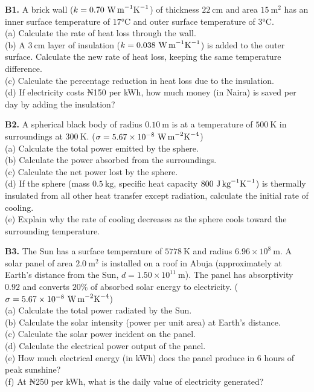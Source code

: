 \begin{exercisebox}[16]
\textbf{B1.} A brick wall ($k = 0.70\ \text{W\,m}^{-1}\text{K}^{-1}$)
of thickness $22\ \text{cm}$ and area $15\ \text{m}^2$
has an inner surface temperature of $17°\text{C}$
and outer surface temperature of $3°\text{C}$.\\[4pt]
(a) Calculate the rate of heat loss through the wall.\\
(b) A $3\ \text{cm}$ layer of insulation
($k = 0.038\ \text{W\,m}^{-1}\text{K}^{-1}$) is
added to the outer surface. Calculate the new rate
of heat loss, keeping the same temperature difference.\\
(c) Calculate the percentage reduction in heat loss
due to the insulation.\\
(d) If electricity costs ₦150 per kWh, how much
money (in Naira) is saved per day by adding the
insulation?
\hfill{}

\vspace{0.4cm}

\textbf{B2.} A spherical black body of radius
$0.10\ \text{m}$ is at a temperature of $500\ \text{K}$
in surroundings at $300\ \text{K}$.
($\sigma = 5.67\times10^{-8}\ \text{W\,m}^{-2}\text{K}^{-4}$)\\[4pt]
(a) Calculate the total power emitted by the sphere.\\
(b) Calculate the power absorbed from the surroundings.\\
(c) Calculate the net power lost by the sphere.\\
(d) If the sphere (mass $0.5\ \text{kg}$, specific
heat capacity $800\ \text{J\,kg}^{-1}\text{K}^{-1}$)
is thermally insulated from all other heat transfer
except radiation, calculate the initial rate of
cooling.\\
(e) Explain why the rate of cooling decreases as
the sphere cools toward the surrounding temperature.
\hfill{}

\vspace{0.4cm}

\textbf{B3.} The Sun has a surface temperature of
$5778\ \text{K}$ and radius $6.96\times10^8\ \text{m}$.
A solar panel of area $2.0\ \text{m}^2$ is installed
on a roof in Abuja (approximately at Earth's distance
from the Sun, $d = 1.50\times10^{11}\ \text{m}$).
The panel has absorptivity $0.92$ and converts $20\%$
of absorbed solar energy to electricity.
($\sigma = 5.67\times10^{-8}\ \text{W\,m}^{-2}\text{K}^{-4}$)\\[4pt]
(a) Calculate the total power radiated by the Sun.\\
(b) Calculate the solar intensity (power per unit
area) at Earth's distance.\\
(c) Calculate the solar power incident on the panel.\\
(d) Calculate the electrical power output of
the panel.\\
(e) How much electrical energy (in kWh) does the
panel produce in 6 hours of peak sunshine?\\
(f) At ₦250 per kWh, what is the daily value of
electricity generated?
\hfill{}


\end{exercisebox}
